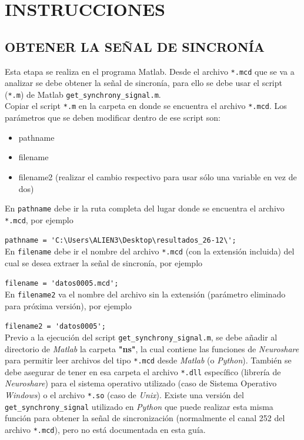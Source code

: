 \documentclass[10pt]{article}
\begin{document}
\section{ \textbf{INSTRUCCIONES} }

\subsection{ OBTENER LA SEÑAL DE SINCRONÍA }

Esta etapa se realiza en el programa Matlab. Desde el archivo \verb+*.mcd+ que se va a analizar se debe obtener la señal de sincronía, para ello se debe usar el script (\verb+*.m+) de Matlab \verb+get_synchrony_signal.m+. \\

Copiar el script \verb+*.m+ en la carpeta en donde se encuentra el archivo \verb+*.mcd+. Los parámetros que se deben modificar dentro de ese script son:
\begin{itemize}
\item pathname
\item filename
\item filename2 (realizar el cambio respectivo para usar sólo una variable en vez de dos)
\end{itemize} 

En \verb+pathname+ debe ir la ruta completa del lugar donde se encuentra el archivo \verb+*.mcd+, por ejemplo

\verb+pathname = 'C:\Users\ALIEN3\Desktop\resultados_26-12\';+ \\

En \verb+filename+ debe ir el nombre del archivo \verb+*.mcd+ (con la extensión incluida) del cual se desea extraer la señal de sincronía, por ejemplo

\verb+filename = 'datos0005.mcd';+ \\

En \verb+filename2+ va el nombre del archivo sin la extensión (parámetro eliminado para próxima versión), por ejemplo 

\verb+filename2 = 'datos0005';+ \\

Previo a la ejecución del script \verb+get_synchrony_signal.m+, se debe añadir al directorio de \textit{Matlab} la carpeta \textbf{"ns"}, la cual contiene las funciones de \textit{Neuroshare} para permitir leer archivos del tipo \verb+*.mcd+ desde \textit{Matlab} (o \textit{Python}). También se debe asegurar de tener en esa carpeta el archivo \verb+*.dll+ específico (librería de \textit{Neuroshare}) para el sistema operativo utilizado (caso de Sistema Operativo \textit{Windows}) o el archivo \verb+*.so+ (caso de \textit{Unix}). Existe una versión del \verb+get_synchrony_signal+ utilizado en \textit{Python} que puede realizar esta misma función para obtener la señal de sincronización (normalmente el canal 252 del archivo \verb+*.mcd+), pero no está documentada en esta guía. \\
\end{document}
